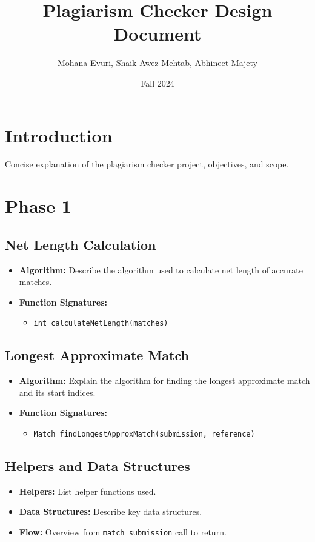 \documentclass[12pt]{article}
\title{Plagiarism Checker Design Document}
\author{Mohana Evuri, Shaik Awez Mehtab, Abhineet Majety}
\date{Fall 2024}
\begin{document}
\maketitle

\section{Introduction}
Concise explanation of the plagiarism checker project, objectives, and scope.

\section{Phase 1}

\subsection{Net Length Calculation}
\begin{itemize}[noitemsep]
    \item \textbf{Algorithm:} Describe the algorithm used to calculate net length of accurate matches.
    \item \textbf{Function Signatures:} 
    \begin{itemize}
        \item \texttt{int calculateNetLength(matches)}
    \end{itemize}
\end{itemize}

\subsection{Longest Approximate Match}
\begin{itemize}[noitemsep]
    \item \textbf{Algorithm:} Explain the algorithm for finding the longest approximate match and its start indices.
    \item \textbf{Function Signatures:}
    \begin{itemize}
        \item \texttt{Match findLongestApproxMatch(submission, reference)}
    \end{itemize}
\end{itemize}

\subsection{Helpers and Data Structures}
\begin{itemize}[noitemsep]
    \item \textbf{Helpers:} List helper functions used.
    \item \textbf{Data Structures:} Describe key data structures.
    \item \textbf{Flow:} Overview from \texttt{match\_submission} call to return.
\end{itemize}
\end{document}
